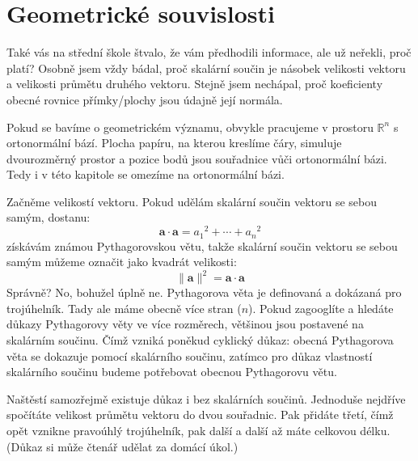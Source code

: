 \documentclass[a5paper,12pt]{amsbook}
\theoremstyle{definition}
\newcommand{\myvec}[1]{\bm{#1}}
\begin{document}
\section{Geometrické souvislosti}

\noindent Také vás na střední škole štvalo, že vám předhodili informace, ale už neřekli, proč platí?
Osobně jsem vždy bádal, proč skalární součin je násobek velikosti vektoru a velikosti průmětu druhého
vektoru. Stejně jsem nechápal, proč koeficienty obecné rovnice přímky/plochy jsou údajně její normála.

\medskip\noindent
Pokud se bavíme o geometrickém významu, obvykle pracujeme v prostoru $\mathbb{R}^n$ s ortonormální
bází. Plocha papíru, na kterou kreslíme čáry, simuluje dvourozměrný prostor a pozice bodů jsou
souřadnice vůči ortonormální bázi. Tedy i v této kapitole se omezíme na ortonormální bázi.

Začněme velikostí vektoru. Pokud udělám skalární součin vektoru se sebou samým, dostanu:
\begin{equation*}
\myvec{a}\cdot\myvec{a} = {a_1}^2 + \cdots + {a_n}^2
\end{equation*}
získávám známou Pythagorovskou větu, takže skalární součin vektoru se sebou samým můžeme označit
jako kvadrát velikosti:
\begin{equation*}
\|\myvec{a}\|^2 = \myvec{a}\cdot\myvec{a}
\end{equation*}
Správně? No, bohužel úplně ne. Pythagorova věta je definovaná a dokázaná pro trojúhelník. Tady ale máme
obecně více stran ($n$). Pokud zagooglíte a hledáte důkazy Pythagorovy věty ve více rozměrech,
většinou jsou postavené na skalárním součinu. Čímž vzniká poněkud cyklický důkaz: obecná Pythagorova
věta se dokazuje pomocí skalárního součinu, zatímco pro důkaz vlastností skalárního součinu budeme
potřebovat obecnou Pythagorovu větu.

Naštěstí samozřejmě existuje důkaz i bez skalárních součinů. Jednoduše nejdříve spočítáte velikost
průmětu vektoru do dvou souřadnic. Pak přidáte třetí, čímž opět vznikne pravoúhlý trojúhelník, pak
další a další až máte celkovou délku. (Důkaz si může čtenář udělat za domácí úkol.)
\end{document}
